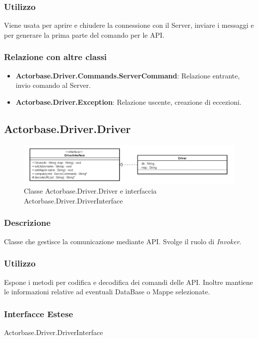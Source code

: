 \documentclass[a4paper]{article}
\begin{document}
		\subsubsection{Utilizzo}
			Viene usata per aprire e chiudere la connessione con il Server, inviare i messaggi e per generare la prima parte del comando per le API.
		\subsubsection{Relazione con altre classi}
			\begin{itemize}
				\item \textbf{Actorbase.Driver.Commands.ServerCommand}: Relazione entrante, invio comando al Server.
				\item \textbf{Actorbase.Driver.Exception}: Relazione uscente, creazione di eccezioni.
			\end{itemize}
		
		\subsection{Actorbase.Driver.Driver}
		\begin{figure} [H]
			\centering
			\includegraphics[scale=0.5]{ST/Client/DriverClasse.png}
        	\caption{Classe Actorbase.Driver.Driver e interfaccia Actorbase.Driver.DriverInterface}
		\end{figure}
		
		\subsubsection{Descrizione}
			Classe che gestisce la comunicazione mediante API. Svolge il ruolo di \emph{Invoker}.
		\subsubsection{Utilizzo}
			Espone i metodi per codifica e decodifica dei comandi delle API. Inoltre mantiene le informazioni relative ad eventuali DataBase o Mappe selezionate.
		\subsubsection{Interfacce Estese}
			Actorbase.Driver.DriverInterface
\end{document}

